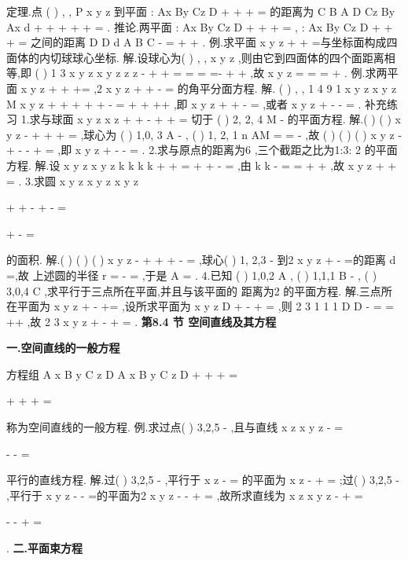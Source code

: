 \textcolor{lyred}{定理}.点
(
)
,
,
P x
y z
到平面
:
Ax
By
Cz
D
\Pi 
+
+
+
=
的距离为 
C
B
A
D
Cz
By
Ax
d
+
+
+
+
+
=
. 
\textcolor{lyred}{推论}.两平面
:
Ax
By
Cz
D
\Pi 
+
+
+
=
,
:
Ax
By
Cz
D
\Pi 
+
+
+
=
之间的距离 
D
D
d
A
B
C
-
=
+
+
. 
\textcolor{lyred}{例}.求平面
x
y
z
+
+
=与坐标面构成四面体的内切球球心坐标. 
解.设球心为(
)
,
,
x
y z
,则由它到四面体的四个面距离相等,即 
(
)
1 3
x
y
z
x
y
z
z
z
-
+
+
=
=
=
\Rightarrow 
=-
+
+
,故
x
y
z
=
=
=
+
. 
\textcolor{lyred}{例}.求两平面
x
y
z
+
+
+=
,2
x
y
z
+
+
-
=
的角平分面方程. 
解.
(
)
, ,
1 4
9 1
x
y
z
x
y
z
M x y z
+
+
+
+
+
-
\in \Pi \Leftrightarrow 
=
+
+
++
,即 
x
y
z
+
+
-
=
,或者
x
y
z
+
-
-
=
. 
\textcolor{lyred}{补充练习 }
1.求与球面
x
y
z
x
z
+
+
-
+
+
=
切于
(
)
2,
2, 4
M
-
的平面方程. 
解.(
)
(
)
x
y
z
-
+
+
+
=
,球心为
(
)
1,0, 3
A
-
,
(
)
1,
2, 1
n
AM
=
=
-
\xi \xi \xi \xi \rho 
\rho 
,故 
(
)
(
)
(
)
x
y
z
\cdots 
-
+
\cdots 
-
-\cdots 
+
=
,即
x
y
z
+
-
-
=
. 
2.求与原点的距离为6 ,三个截距之比为1:3: 2 的平面方程. 
解.设
x
y
z
x
y
z
k
k
k
k
+
+
=\Rightarrow 
+
+
-
=
,由
k
k
-
=
\Rightarrow 
=\pm 
+
+
,故 
x
y
z
+
+
\pm 
=
. 
3.求圆
x
y
z
x
y
z
x
y
z

+
+
-
+
-
=

+
-
=

的面积. 
解.(
)
(
)
(
)
x
y
z
-
+
+
+
-
=
,球心(
)
1, 2,3
-
到2
x
y
z
+
-
=的距离
d =,故 
上述圆的半径
r =
-
=
,于是
A
\pi 
=
. 
4.已知
(
)
1,0,2
A
,
(
)
1,1,1
B -
,
(
)
3,0,4
C
,求平行于三点所在平面,并且与该平面的 
距离为2 的平面方程. 
解.三点所在平面为
x
y
z
+
-
+=
,设所求平面为
x
y
z
D
+
-
+
=
,则 
2 3
1 1 1
D
D
-
=
\Rightarrow 
=\pm 
++
,故
2 3
x
y
z
+
-
+\pm 
=
. 
\vspace{6pt}
{\large \bfseries \textcolor{lyred}{第8.4 节 空间直线及其方程}}

\vspace{4pt}
{\bfseries \textcolor{lyred}{一.空间直线的一般方程}}

方程组
A x
B y
C z
D
A x
B y
C z
D
+
+
+
=


+
+
+
=

称为空间直线的\textcolor{lyred}{一般方程}. 
\textcolor{lyred}{例}.求过点(
)
3,2,5
-
,且与直线
x
z
x
y
z
-
=


-
-
=

平行的直线方程. 
解.过(
)
3,2,5
-
,平行于
x
z
-
=
的平面为
x
z
-
+
=
;过(
)
3,2,5
-
,平行于 
x
y
z
-
-
=的平面为2
x
y
z
-
-
+
=
,故所求直线为
x
z
x
y
z
-
+
=


-
-
+
=

. 
\vspace{4pt}
{\bfseries \textcolor{lyred}{二.平面束方程}}

